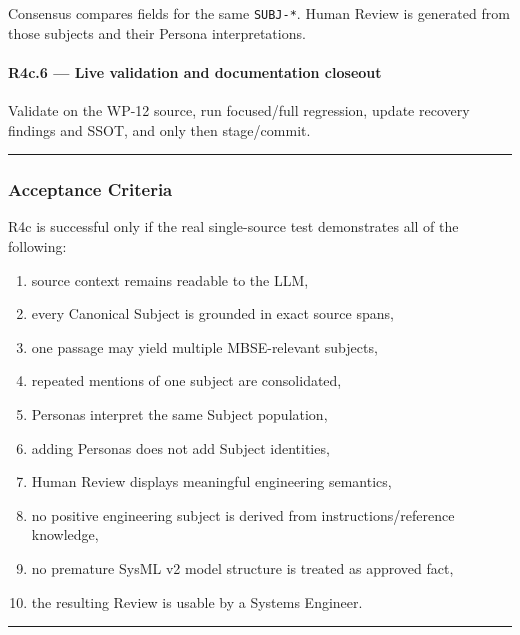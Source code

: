 Consensus compares fields for the same \texttt{SUBJ-*}. Human Review is generated from those subjects and their Persona interpretations.

\hypertarget{r4c6--live-validation-and-documentation-closeout}{%
\paragraph{R4c.6 --- Live validation and documentation closeout}\label{r4c6--live-validation-and-documentation-closeout}}

Validate on the WP-12 source, run focused/full regression, update recovery findings and SSOT, and only then stage/commit.

\begin{center}\rule{0.5\linewidth}{0.5pt}\end{center}

\hypertarget{acceptance-criteria-2}{%
\subsubsection{Acceptance Criteria}\label{acceptance-criteria-2}}

R4c is successful only if the real single-source test demonstrates all of the following:

\begin{enumerate}
\def\labelenumi{\arabic{enumi}.}
\tightlist
\item
  source context remains readable to the LLM,
\item
  every Canonical Subject is grounded in exact source spans,
\item
  one passage may yield multiple MBSE-relevant subjects,
\item
  repeated mentions of one subject are consolidated,
\item
  Personas interpret the same Subject population,
\item
  adding Personas does not add Subject identities,
\item
  Human Review displays meaningful engineering semantics,
\item
  no positive engineering subject is derived from instructions/reference knowledge,
\item
  no premature SysML v2 model structure is treated as approved fact,
\item
  the resulting Review is usable by a Systems Engineer.
\end{enumerate}

\begin{center}\rule{0.5\linewidth}{0.5pt}\end{center}

